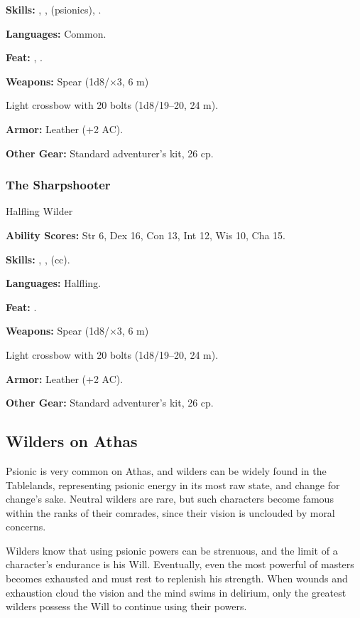 \textbf{Skills:} , ,  (psionics), .

\textbf{Languages:} Common.

\textbf{Feat:} , .

\textbf{Weapons:} Spear (1d8/$\times$3, 6 m)

Light crossbow with 20 bolts (1d8/19--20, 24 m).

\textbf{Armor:} Leather (+2 AC).

\textbf{Other Gear:} Standard adventurer's kit, 26 cp.

\subsubsection{The Sharpshooter}
Halfling Wilder

\textbf{Ability Scores:} Str 6, Dex 16, Con 13, Int 12, Wis 10, Cha 15.

\textbf{Skills:} , ,  (cc).

\textbf{Languages:} Halfling.

\textbf{Feat:} .

\textbf{Weapons:} Spear (1d8/$\times$3, 6 m)

Light crossbow with 20 bolts (1d8/19--20, 24 m).

\textbf{Armor:} Leather (+2 AC).

\textbf{Other Gear:} Standard adventurer's kit, 26 cp.

\subsection{Wilders on Athas}

Psionic is very common on Athas, and wilders can be widely found in the Tablelands, representing psionic energy in its most raw state, and change for change's sake. Neutral wilders are rare, but such characters become famous within the ranks of their comrades, since their vision is unclouded by moral concerns.

Wilders know that using psionic powers can be strenuous, and the limit of a character's endurance is his Will. Eventually, even the most powerful of masters becomes exhausted and must rest to replenish his strength. When wounds and exhaustion cloud the vision and the mind swims in delirium, only the greatest wilders possess the Will to continue using their powers.

